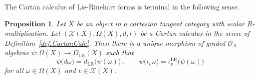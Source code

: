 \documentclass[12pt,reqno, a4paper]{amsart}
\numberwithin{equation}{section}
\theoremstyle{plain}
\newtheorem{Proposition}[Theorem]{Proposition}
\theoremstyle{definition}
\theoremstyle{remark}
\newcommand{\calO}{\mathcal{O}}
\newcommand{\calX}{\mathcal{X}}
\begin{document}
The Cartan calculus of Lie-Rinehart forms is terminal in the following sense.

\begin{Proposition}
\label{prop:LRterminal}
Let $X$ be an object in a cartesian tangent category with scalar $R$-multiplication. Let $(\calX(X), \Omega(X), d, \iota)$ be a Cartan calculus in the sense of Definition~\ref{def:CartanCalc}. Then there is a unique morphism of graded $\calO_X$-algebras $\psi: \Omega(X) \to \Omega_\mathrm{LR}(X)$ such that
\begin{equation*}
  \psi\bigl( d\omega \bigr)
  = d_\mathrm{LR} \bigl( \psi(\omega) \bigr)
  \,,\qquad
  \psi\bigl( \iota_v \omega \bigr)
  = \iota^\mathrm{LR}_v \bigl( \psi(\omega) \bigr)
\end{equation*}
for all $\omega \in \Omega(X)$ and $v \in \calX(X)$.
\end{Proposition}
\end{document}

